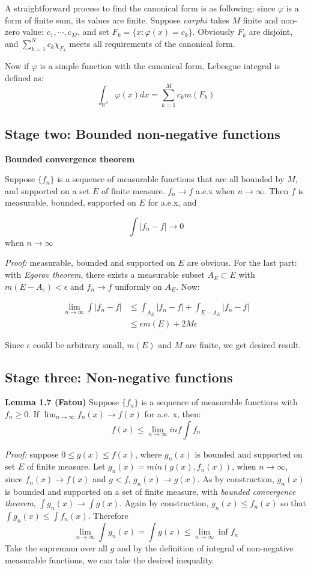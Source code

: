 \documentclass[
]{article}
\begin{document}
A straightforward process to find the canonical form is as following: since \(\varphi\) is a form of finite sum,
its values are finite. Suppose \(varphi\) takes \(M\) finite and non-zero value: \(c_1, \cdots, c_M\), and
set \(F_k=\{x: \varphi(x)=c_k\}\). Obviously \(F_k\) are disjoint, and \(\sum_{k=1}^Nc_k\chi_{F_k}\) meets all
requirements of the canonical form.

Now if \(\varphi\) is a simple function with the canonical form, Lebesgue integral is defined as:
\[\int_{\mathbb{R}^d}\varphi(x)dx=\sum_{k=1}^Mc_km(F_k)\]

\subsection{Stage two: Bounded non-negative functions}

\textbf{Bounded convergence theorem}

Suppose \(\{f_n\}\) is a sequence of measurable functions that are all bounded by \(M\), and supported
on a set \(E\) of finite measure. \(f_n\to f\) a.e.x when \(n\to\infty\). Then \(f\) is measurable,
bounded, supported on \(E\) for a.e.x, and

\[\int |f_n-f|\to 0\] when \(n\to\infty\)

\textit{Proof:} measurable, bounded and supported on \(E\) are obvious. For the last part: with
\textit{Egorov theorem}, there exists a measurable subset \(A_E\subset E\) with \(m(E-A_e)<\epsilon\) and
\(f_n\to f\) uniformly on \(A_E\). Now:

\[
  \begin{split}
    \lim_{n\to\infty}\int |f_n-f|&\leq \int_{A_E}|f_n-f|+\int_{E-A_E}|f_n-f|\\
    &\leq \epsilon m(E) + 2M\epsilon 
  \end{split}
\]

Since \(\epsilon\) could be arbitrary small, \(m(E)\) and \(M\) are finite, we get desired result.

\subsection{Stage three: Non-negative functions}
\textbf{Lemma 1.7 (Fatou)} Suppose \(\{f_n\}\) is a sequence of measurable functions with \(f_n \geq 0\). If 
\(\lim_{n\to\infty}f_n(x)\to f(x)\) for a.e. x, then:
\[f(x)\leq \lim_{n\to\infty}inf\int f_n\]

\textit{Proof:} suppose \(0\leq g(x) \leq f(x)\), where \(g_n(x)\) is bounded and supported on set \(E\)
of finite measure. Let \(g_n(x)=min(g(x), f_n(x))\), when \(n\to\infty\), since \(f_n(x)\to f(x)\) and \(g<f\),
\(g_n(x)\to g(x)\). As by construction, \(g_n(x)\) is bounded and supported on a set of finite measure, with \textit{bounded convergence theorem},
\(\int g_n(x)\to \int g(x)\). Again by construction, \(g_n(x)\leq f_n(x)\) so that \(\int g_n(x) \leq \int f_n(x)\). Therefore
\[
  \lim_{n\to\infty}\int g_n(x)=\int g(x) \leq \lim_{n\to\infty}\inf f_n
\]
Take the supremum over all \(g\) and by the definition of integral of non-negative measurable functions,
we can take the desired inequality.
\end{document}
